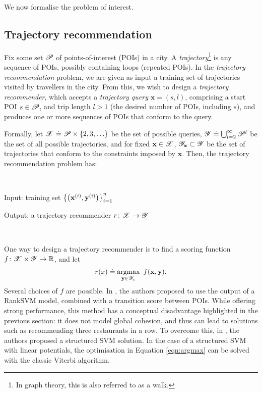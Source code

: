 
We now formalise the problem of interest.

%
\subsection{Trajectory recommendation}

Fix some set $\mathscr{P}$ of points-of-interest (POIs) in a city.
A \emph{trajectory}\footnote{In graph theory, this is also referred to as a walk.} is any sequence of POIs, possibly containing loops (repeated POIs).
In the \emph{trajectory recommendation} problem, we are given as input a training set of trajectories visited by travellers in the city.
From this, we wish to design a \emph{trajectory recommender}, which accepts a
\emph{trajectory query} $\mathbf{x} = (s, l)$, comprising a start POI $s \in \mathscr{P}$, and trip length $l \!>\! 1$ (\ie the desired number of POIs, including $s$),
and produces one or more sequences of POIs that conform to the query.

Formally, let $\mathscr{X} \stackrel{.}{=} \mathscr{P} \times \{ 2, 3, \ldots \}$ be the set of possible queries,
$\mathscr{Y} \stackrel{.}{=} \bigcup_{l = 2}^\infty \mathscr{P}^l$ be the set of all possible trajectories,
and for fixed $\mathbf{x} \in \mathscr{X}$, $\mathscr{Y}_{\mathbf{x}} \subset \mathscr{Y}$ be the set of trajectories that conform to the constraints imposed by $\mathbf{x}$.
Then, the {trajectory recommendation} problem has:

\

{\sc Input}: training set $\left\{ \left( \mathbf{x}^{(i)}, \mathbf{y}^{(i)} \right) \right\}_{i = 1}^n$ %

{\sc Output}: a trajectory recommender $r \colon \mathscr{X} \to \mathscr{Y}$ 

\

One way to design a trajectory recommender is to find a scoring function $f \colon \mathscr{X} \times \mathscr{Y} \to \mathbb{R}$, and let
\begin{equation}
	\label{eqn:argmax}
	r( x ) \stackrel{.}{=} \operatorname*{argmax}_{\mathbf{y} \in \mathscr{Y}_x}~f(\mathbf{x}, \mathbf{y}).
\end{equation}
Several choices of $f$ are possible.
In \citet{cikm16paper}, the authors proposed to use the output of a RankSVM model, combined with a transition score between POIs.
While offering strong performance, this method has a conceptual disadvantage highlighted in the previous section:
it does not model global cohesion, and thus can lead to solutions such as recommending three restaurants in a row.
To overcome this, in \citet{Chen:2017}, the authors proposed a structured SVM solution.
In the case of a structured SVM with linear potentials, the optimisation in Equation \ref{eqn:argmax} can be solved with the classic Viterbi algorithm.


